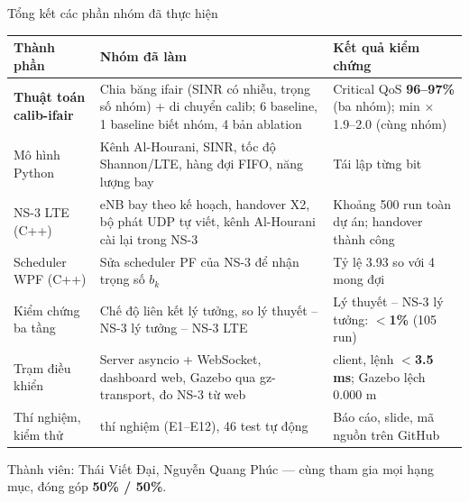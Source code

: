 \documentclass[aspectratio=169,10pt,t]{beamer}
\newcommand{\good}[1]{\textcolor{Good}{\textbf{#1}}}
\begin{document}
\begin{frame}{Tổng kết các phần nhóm đã thực hiện}
\scriptsize
\renewcommand{\arraystretch}{1.3}
\begin{tabularx}{\linewidth}{@{}>{\raggedright\arraybackslash}p{3.1cm}>{\raggedright\arraybackslash}X>{\raggedright\arraybackslash}p{3.3cm}@{}}
  \toprule
  \textbf{Thành phần} & \textbf{Nhóm đã làm} & \textbf{Kết quả kiểm chứng}\\
  \midrule
  \textbf{Thuật toán calib-ifair} & Chia băng ifair (SINR có nhiễu, trọng số nhóm) + di chuyển calib; 6 baseline, 1 baseline biết nhóm, 4 bản ablation & Critical QoS \good{96--97\%} (ba nhóm); min $\times$1.9--2.0 (cùng nhóm)\\
  Mô hình Python & Kênh Al-Hourani, SINR, tốc độ Shannon/LTE, hàng đợi FIFO, năng lượng bay & Tái lập từng bit\\
  NS-3 LTE (C++) & eNB bay theo kế hoạch, handover X2, bộ phát UDP tự viết, kênh Al-Hourani cài lại trong NS-3 & Khoảng 500 run toàn dự án; handover thành công\\
  Scheduler WPF (C++) & Sửa scheduler PF của NS-3 để nhận trọng số $b_k$ & Tỷ lệ 3.93 so với 4 mong đợi\\
  Kiểm chứng ba tầng & Chế độ liên kết lý tưởng, so lý thuyết -- NS-3 lý tưởng -- NS-3 LTE & Lý thuyết -- NS-3 lý tưởng: \good{$<$1\%} (105 run)\\
  Trạm điều khiển & Server asyncio + WebSocket, dashboard web, Gazebo qua gz-transport, đo NS-3 từ web & 50 client, lệnh \good{$<$3.5 ms}; Gazebo lệch 0.000 m\\
  Thí nghiệm, kiểm thử & 12 thí nghiệm (E1--E12), 46 test tự động & Báo cáo, slide, mã nguồn trên GitHub\\
  \bottomrule
\end{tabularx}

\vspace{2mm}
\footnotesize Thành viên: Thái Viết Đại, Nguyễn Quang Phúc --- cùng tham gia mọi hạng mục, đóng góp \textbf{50\% / 50\%}.
\end{frame}
\end{document}
